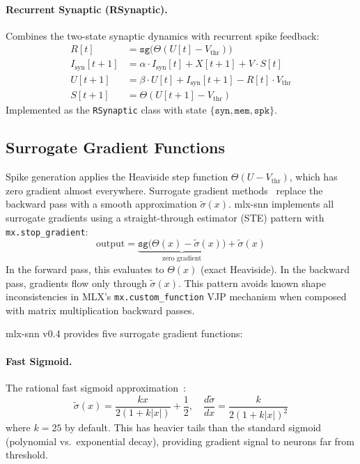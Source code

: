 \documentclass[11pt]{article}
\begin{document}
\paragraph{Recurrent Synaptic (RSynaptic).}
Combines the two-state synaptic dynamics with recurrent spike feedback:
\begin{align}
    R[t] &= \texttt{sg}\big(\Theta(U[t] - V_{\text{thr}})\big) \label{eq:rsyn_reset} \\
    I_{\text{syn}}[t+1] &= \alpha \cdot I_{\text{syn}}[t] + X[t+1] + V \cdot S[t] \label{eq:rsyn_i} \\
    U[t+1] &= \beta \cdot U[t] + I_{\text{syn}}[t+1] - R[t] \cdot V_{\text{thr}} \label{eq:rsyn_mem} \\
    S[t+1] &= \Theta(U[t+1] - V_{\text{thr}}) \label{eq:rsyn_spike}
\end{align}
Implemented as the \texttt{RSynaptic} class with state $\{\texttt{syn}, \texttt{mem}, \texttt{spk}\}$.

\subsection{Surrogate Gradient Functions}
\label{sec:surrogates}

Spike generation applies the Heaviside step function $\Theta(U - V_{\text{thr}})$, which has zero gradient almost everywhere. Surrogate gradient methods~\citep{neftci2019surrogate} replace the backward pass with a smooth approximation $\tilde{\sigma}(x)$. mlx-snn implements all surrogate gradients using a straight-through estimator (STE) pattern with \texttt{mx.stop\_gradient}:
\begin{equation}
    \text{output} = \underbrace{\texttt{sg}\big(\Theta(x) - \tilde{\sigma}(x)\big)}_{\text{zero gradient}} + \tilde{\sigma}(x)
    \label{eq:ste}
\end{equation}
In the forward pass, this evaluates to $\Theta(x)$ (exact Heaviside). In the backward pass, gradients flow only through $\tilde{\sigma}(x)$. This pattern avoids known shape inconsistencies in MLX's \texttt{mx.custom\_function} VJP mechanism when composed with matrix multiplication backward passes.

mlx-snn v0.4 provides five surrogate gradient functions:

\paragraph{Fast Sigmoid.}
The rational fast sigmoid approximation~\citep{zenke2021remarkable}:
\begin{equation}
    \tilde{\sigma}(x) = \frac{kx}{2(1+k|x|)} + \frac{1}{2}, \quad \frac{d\tilde{\sigma}}{dx} = \frac{k}{2(1+k|x|)^2}
    \label{eq:fast_sigmoid}
\end{equation}
where $k=25$ by default. This has heavier tails than the standard sigmoid (polynomial vs.\ exponential decay), providing gradient signal to neurons far from threshold.
\end{document}
